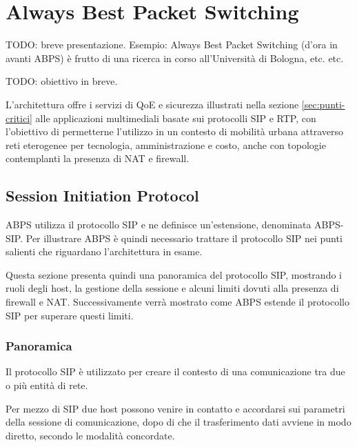\documentclass[12pt,a4paper,openright,twoside]{book}
\begin{document}

\clearpage{\pagestyle{empty}\cleardoublepage}

\chapter{Always Best Packet Switching}
TODO: breve presentazione. Esempio: Always Best Packet Switching
(d'ora in avanti ABPS) è frutto di una ricerca in corso all'Università
di Bologna, etc. etc.

TODO: obiettivo in breve.

L'architettura offre i servizi di QoE e sicurezza illustrati nella
sezione \ref{sec:punti-critici} alle applicazioni multimediali basate
sui protocolli SIP e RTP, con l'obiettivo di permetterne l'utilizzo in
un contesto di mobilità urbana attraverso reti eterogenee per
tecnologia, amministrazione e costo, anche con topologie contemplanti la
presenza di NAT e firewall.

\section{Session Initiation Protocol}

ABPS utilizza il protocollo SIP e ne definisce un'estensione,
denominata ABPS-SIP. Per illustrare ABPS è quindi necessario trattare
il protocollo SIP nei punti salienti che riguardano l'architettura in
esame.

Questa sezione presenta quindi una panoramica del protocollo SIP,
mostrando i ruoli degli host, la gestione della sessione e alcuni
limiti dovuti alla presenza di firewall e NAT. Successivamente verrà
mostrato come ABPS estende il protocollo SIP per superare questi
limiti.

\subsection{Panoramica}

Il protocollo SIP è utilizzato per creare il contesto di una
comunicazione tra due o più entità di rete.

Per mezzo di SIP due host possono venire in contatto e accordarsi sui
parametri della sessione di comunicazione, dopo di che il
trasferimento dati avviene in modo diretto, secondo le modalità
concordate.
\end{document}
